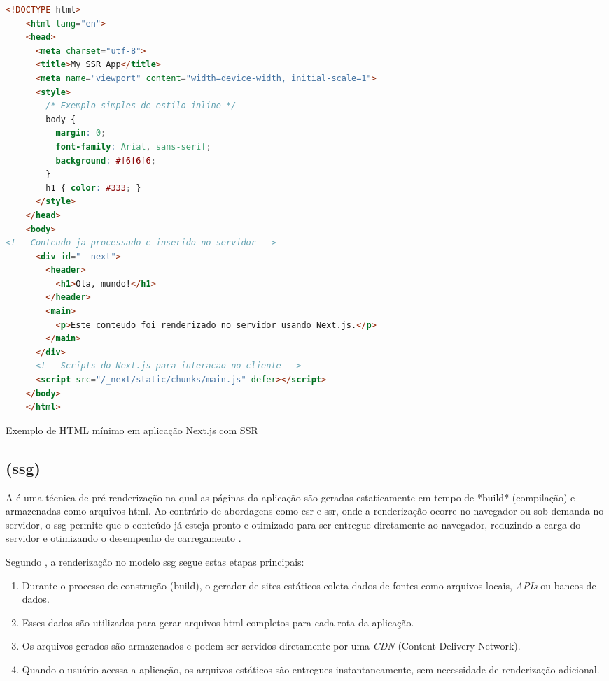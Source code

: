\begin{codigo}[H]
  \begin{lstlisting}[language=html]
    <!DOCTYPE html>
    <html lang="en">
    <head>
      <meta charset="utf-8">
      <title>My SSR App</title>
      <meta name="viewport" content="width=device-width, initial-scale=1">
      <style>
        /* Exemplo simples de estilo inline */
        body {
          margin: 0;
          font-family: Arial, sans-serif;
          background: #f6f6f6;
        }
        h1 { color: #333; }
      </style>
    </head>
    <body>
<!-- Conteudo ja processado e inserido no servidor -->
      <div id="__next">
        <header>
          <h1>Ola, mundo!</h1>
        </header>
        <main>
          <p>Este conteudo foi renderizado no servidor usando Next.js.</p>
        </main>
      </div>
      <!-- Scripts do Next.js para interacao no cliente -->
      <script src="/_next/static/chunks/main.js" defer></script>
    </body>
    </html>
  \end{lstlisting}
  \caption{Exemplo de HTML mínimo em aplicação Next.js com SSR}
  \label{cod:nextjs_html}
\end{codigo}

\subsection{ (\acrshort{ssg})}
\label{subsec:ssg}

A \textbf{} é uma técnica de pré-renderização na qual as páginas da aplicação são geradas estaticamente em tempo de *build* (compilação) e armazenadas como arquivos \acrshort{html}. Ao contrário de abordagens como \acrshort{csr} e \acrshort{ssr}, onde a renderização ocorre no navegador ou sob demanda no servidor, o \acrshort{ssg} permite que o conteúdo já esteja pronto e otimizado para ser entregue diretamente ao navegador, reduzindo a carga do servidor e otimizando o desempenho de carregamento \cite{pahan2021}.

Segundo , a renderização no modelo \acrshort{ssg} segue estas etapas principais:

\begin{enumerate}
    \item Durante o processo de construção (build), o gerador de sites estáticos coleta dados de fontes como arquivos locais, \emph{APIs} ou bancos de dados.
    \item Esses dados são utilizados para gerar arquivos \acrshort{html} completos para cada rota da aplicação.
    \item Os arquivos gerados são armazenados e podem ser servidos diretamente por uma \emph{CDN} (Content Delivery Network).
    \item Quando o usuário acessa a aplicação, os arquivos estáticos são entregues instantaneamente, sem necessidade de renderização adicional.
\end{enumerate}

